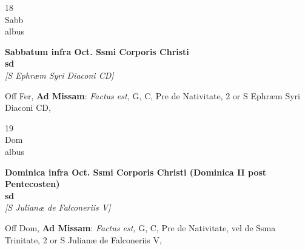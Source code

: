 \documentclass[10pt, openany]{book}
\begin{document}
        \begin{center}
            \begin{minipage}{3.5in}
                \vspace{2em}
                \begin{minipage}{0.5in}
                    {\Huge 18} \\
                    {\normalsize Sabb} \\
                    {\normalsize albus}
                \end{minipage}
                \begin{minipage}{3.0in}
                    \textbf{ \large Sabbatum infra Oct. Ssmi Corporis Christi \\
                    \textnormal{\normalsize sd}} \\ \textit{[S Ephræm Syri Diaconi CD]} \\ 
                \end{minipage}
                \begin{justify}Off Fer, \textbf{Ad Missam}: \textit{Factus est,} G, C, Pre de Nativitate, 2 or S Ephræm Syri Diaconi CD,  
                \end{justify}
            \end{minipage}
        \end{center}
    
        \begin{center}
            \begin{minipage}{3.5in}
                \vspace{2em}
                \begin{minipage}{0.5in}
                    {\Huge 19} \\
                    {\normalsize Dom} \\
                    {\normalsize albus}
                \end{minipage}
                \begin{minipage}{3.0in}
                    \textbf{ \large Dominica infra Oct. Ssmi Corporis Christi (Dominica II post Pentecosten) \\
                    \textnormal{\normalsize sd}} \\ \textit{[S Julianæ de Falconeriis V]} \\ 
                \end{minipage}
                \begin{justify}Off Dom, \textbf{Ad Missam}: \textit{Factus est,} G, C, Pre de Nativitate, vel de Ssma Trinitate, 2 or S Julianæ de Falconeriis V,  
                \end{justify}
            \end{minipage}
        \end{center}
    
\end{document}
